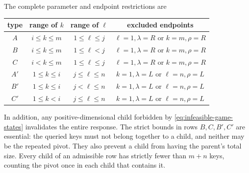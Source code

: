 \documentclass[11pt]{article}
\theoremstyle{definition}
\theoremstyle{remark}
\begin{document}
The complete parameter and endpoint restrictions are
\begin{center}
\begin{tabular}{c|c|c|c}
type & range of $k$ & range of $\ell$ & excluded endpoints\\ \hline
$A$  & $i\le k\le m$ & $1\le\ell\le j$
     & $\ell=1,\lambda=R$ or $k=m,\rho=R$\\
$B$  & $i\le k\le m$ & $1\le\ell<j$
     & $\ell=1,\lambda=R$ or $k=m,\rho=R$\\
$C$  & $i<k\le m$ & $1\le\ell\le j$
     & $\ell=1,\lambda=R$ or $k=m,\rho=R$\\
$A'$ & $1\le k\le i$ & $j\le\ell\le n$
     & $k=1,\lambda=L$ or $\ell=n,\rho=L$\\
$B'$ & $1\le k\le i$ & $j<\ell\le n$
     & $k=1,\lambda=L$ or $\ell=n,\rho=L$\\
$C'$ & $1\le k<i$ & $j\le\ell\le n$
     & $k=1,\lambda=L$ or $\ell=n,\rho=L$
\end{tabular}
\end{center}
In addition, any positive-dimensional child forbidden by
\eqref{eq:infeasible-game-states} invalidates the entire response.
The strict bounds in rows $B,C,B',C'$ are essential: the queried keys
must not belong together to a child, and neither may be the repeated
pivot.  They also prevent a child from having the parent's total size.
Every child of an admissible row has strictly fewer than $m+n$ keys,
counting the pivot once in each child that contains it.
\end{document}
